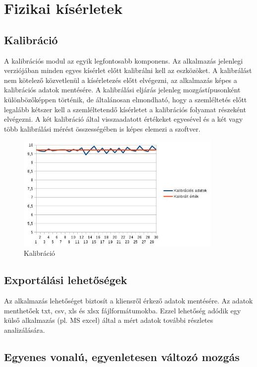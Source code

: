 \documentclass{thesis-ekf}
\theoremstyle{definition}
\theoremstyle{remark}
\begin{document}
\chapter{Fizikai kísérletek}

\section{Kalibráció}

A kalibrációs modul az egyik legfontosabb komponens. Az alkalmazás jelenlegi verziójában minden  egyes kísérlet előtt kalibrálni kell az eszközöket. A kalibrálást nem kötelező közvetlenül a kísérletezés előtt elvégezni, az alkalmazás képes a kalibrációs adatok mentésére. 
A kalibrálási eljárás jelenleg mozgástípusonként különbözőképpen történik, de általánosan elmondható, hogy a szemléltetés előtt legalább kétszer kell a szemléltetendő kísérletet a kalibrációs folyamat részeként elvégezni. A két kalibráció által visszaadatott értékeket egyesével és a két vagy több kalibrálási mérést összességében is képes elemezi a szoftver.


\begin{figure}[!h]
	\centering
	\includegraphics[width=10cm]{kalib}
	\caption{Kalibráció}\label{kalib}
\end{figure}


\section{Exportálási lehetőségek}

Az alkalmazás lehetőséget biztosít a kliensről érkező adatok mentésére. Az adatok menthetőek txt, csv, xls és xlsx fájlformátumokba. Ezzel lehetőség adódik egy külső alkalmazás (pl. MS excel) által a mért adatok további részletes analizálására.  

\section{Egyenes vonalú, egyenletesen változó mozgás}
\end{document}
